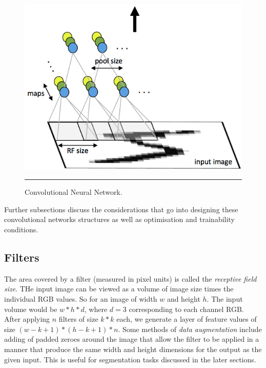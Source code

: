 \begin{figure}[H]
		\centering
		\includegraphics[scale=0.4]{Pictures/cnn.png}
		\rule{35em}{0.5pt}
		\caption[Convolutional Neural Network]{Convolutional Neural Network.}
		\label{fig:rnn}
\end{figure}

Further subsections discuss the considerations that go into designing these convolutional networks structures as well as optimisation and trainability conditions.
\subsection*{Filters}
The area covered by a filter (measured in pixel units) is called the \textit{receptive field size}. THe input image can be viewed as a volume of image size times the individual RGB values. So for an image of width $w$ and height $h$. The input volume would be $w*h*d$, where $d=3$ corresponding to each channel RGB. After applying $n$ filters of size $k*k$ each, we generate a layer of feature values of size $(w-k+1)*(h-k+1)*n$. Some methods of \textit{data augmentation} include adding of padded zeroes around the image that allow the filter to be applied in a manner that produce the same width and height dimensions for the output as the given input. This is useful for segmentation tasks discussed in the later sections.

